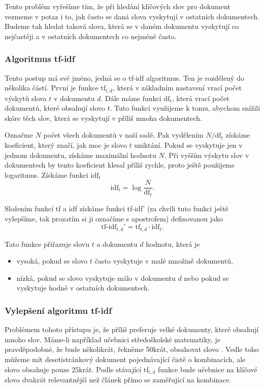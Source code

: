 \documentclass[12pt]{article}
\begin{document}
Tento problém vyřešíme tím, že při hledání klíčových slov pro dokument vezmeme v potaz i to, jak často se daná slova vyskytují v ostatních dokumentech. Budeme tak hledat taková slova, která se v daném dokumentu vyskytují co nejčastěji a v ostatních dokumentech co nejméně často. 


\subsubsection{Algoritmus tf-idf}\label{tfidf}
Tento postup má své jméno, jedná se o tf-idf algoritmus. Ten je rozdělený do několika částí. První je funkce $\mbox{tf}_{t,d}$, která v základním nastavení vrací počet výskytů slova $t$ v dokumentu $d$. Dále máme funkci $\mbox{df}_t$, která vrací počet dokumentů, které obsahují slovo $t$. Tuto funkci využijeme k tomu, abychom snížili skóre těch slov, která se vyskytují v příliš mnoha dokumentech. 

Označme $N$ počet všech dokumentů v naší sadě. Pak vydělením $N/\mbox{df}_t$ získáme koeficient, který značí, jak moc je slovo $t$ uniktání. Pokud se vyskytuje jen v jednom dokumentu, získáme maximální hodnotu $N$. Při vyšším výskytu slov v dokumentech by tento koeficient klesal příliš rychle, proto ještě použijeme logaritmus. Získáme funkci $\mbox{idf}_t$
$$\mbox{idf}_t=\log\frac{N}{\mbox{df}_t}.$$

Složením funkcí tf a idf získáme funkci tf-idf' (za chvíli tuto funkci ještě vylepšíme, tak prozatím si ji označíme s apostrofem) definovanou jako
$$\mbox{tf-idf}_{t,d}'=\mbox{tf}_{t,d}\cdot\mbox{idf}_t.$$

Tato funkce přiřazuje slovu $t$ a dokumentu $d$ hodnotu, která je

\begin{itemize}
\item vysoká, pokud se slovo $t$ často vyskytuje v malé množině dokumentů,
\item nízká, pokud se slovo vyskytuje málo v dokumentu $d$ nebo pokud se vyskytuje hodně v ostatních dokumentech.
\end{itemize}

\subsubsection{Vylepšení algoritmu tf-idf}

Problémem tohoto přístupu je, že příliš preferuje velké dokumenty, které obsahují mnoho slov. Máme-li například učebnici středoškolské matematiky, je pravděpodobné, že bude několikrát, řekněme 50krát, obsahovat slovo . Vedle toho můžeme mít desetistránkový dokument pojednávající čistě o kombinacích, ale slovo  obsahuje pouze 25krát. Podle stávající $\mbox{tf}_{t,d}$ funkce bude učebnice na klíčové slovo  dvakrát relevantnější než článek přímo se zaměřující na kombinace. 
\end{document}
